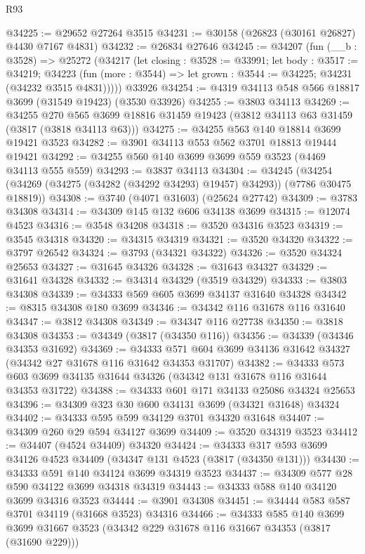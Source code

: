 \begin{lexlean}{R93}
\begin{coremodule}
@34225 := @29652 @27264 @3515
@34231 := @30158 (@26823 (@30161 @26827) @4430 @7167 @4831)
@34232 := @26834 @27646
@34245 := @34207
    (fun (__b : @3528) =>
    @25272
      (@34217
        (let closing : @3528 := @33991;
        let body : @3517 := @34219;
        @34223 (fun (more : @3544) => let grown : @3544 := @34225; @34231 (@34232 @3515 @4831)))))
    @33926
@34254 := @4319 @34113 @548 @566 @18817 @3699 (@31549 @19423) (@3530 @33926)
@34255 := @3803 @34113
@34269 := @34255
    @270
    @565
    @3699
    @18816
    @31459
    @19423
    (@3812 @34113 @63 @31459 (@3817 (@3818 @34113 @63)))
@34275 := @34255 @563 @140 @18814 @3699 @19421 @3523
@34282 := @3901 @34113 @553 @562 @3701 @18813 @19444 @19421
@34292 := @34255 @560 @140 @3699 @3699 @559 @3523 (@4469 @34113 @555 @559)
@34293 := @3837 @34113
@34304 := @34245
    (@34254 (@34269 (@34275 (@34282 (@34292 @34293) @19457) @34293)) (@7786 @30475 @18819))
@34308 := @3740 (@4071 @31603) (@25624 @27742)
@34309 := @3783 @34308
@34314 := @34309 @145 @132 @606 @34138 @3699
@34315 := @12074 @4523
@34316 := @3548 @34208
@34318 := @3520 @34316 @3523
@34319 := @3545 @34318
@34320 := @34315 @34319
@34321 := @3520 @34320
@34322 := @3797 @26542
@34324 := @3793 (@34321 @34322)
@34326 := @3520 @34324 @25653
@34327 := @31645 @34326
@34328 := @31643 @34327
@34329 := @31641 @34328
@34332 := @34314 @34329 (@3519 @34329)
@34333 := @3803 @34308
@34339 := @34333 @569 @605 @3699 @34137 @31640 @34328
@34342 := @8315 @34308 @180 @3699
@34346 := @34342 @116 @31678 @116 @31640
@34347 := @3812 @34308
@34349 := @34347 @116 @27738
@34350 := @3818 @34308
@34353 := @34349 (@3817 (@34350 @116))
@34356 := @34339 (@34346 @34353 @31692)
@34369 := @34333 @571 @604 @3699 @34136 @31642 @34327 (@34342 @27 @31678 @116 @31642 @34353 @31707)
@34382 := @34333 @573 @603 @3699 @34135 @31644 @34326 (@34342 @131 @31678 @116 @31644 @34353 @31722)
@34388 := @34333 @601 @171 @34133 @25086 @34324 @25653
@34396 := @34309 @323 @30 @600 @34131 @3699 (@34321 @31648) @34324
@34402 := @34333 @595 @599 @34129 @3701 @34320 @31648
@34407 := @34309 @260 @29 @594 @34127 @3699
@34409 := @3520 @34319 @3523
@34412 := @34407 (@4524 @34409) @34320
@34424 := @34333 @317 @593 @3699 @34126 @4523 @34409 (@34347 @131 @4523 (@3817 (@34350 @131)))
@34430 := @34333 @591 @140 @34124 @3699 @34319 @3523
@34437 := @34309 @577 @28 @590 @34122 @3699 @34318 @34319
@34443 := @34333 @588 @140 @34120 @3699 @34316 @3523
@34444 := @3901 @34308
@34451 := @34444 @583 @587 @3701 @34119 (@31668 @3523) @34316
@34466 := @34333
    @585
    @140
    @3699
    @3699
    @31667
    @3523
    (@34342 @229 @31678 @116 @31667 @34353 (@3817 (@31690 @229)))

\end{coremodule}
\end{lexlean}

